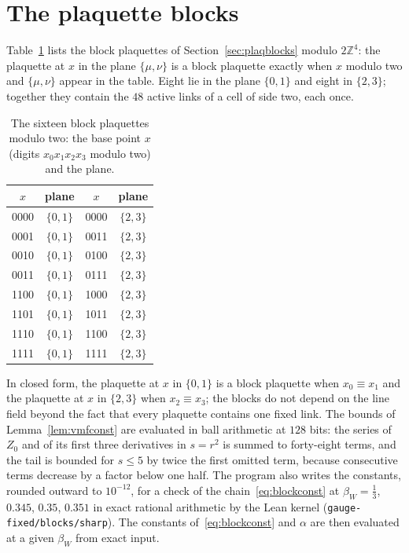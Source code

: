 \documentclass[11pt]{amsart}
\theoremstyle{definition}
\theoremstyle{remark}
\numberwithin{equation}{section}
\newcommand{\Z}{\mathbb{Z}}
\begin{document}
\section{The plaquette blocks}\label{app:plaqblocks}

Table~\ref{tab:plaqblocks} lists the block plaquettes of
Section~\ref{sec:plaqblocks} modulo $2\Z^4$: the plaquette at $x$ in the plane
$\{\mu,\nu\}$ is a block plaquette exactly when $x$ modulo two and
$\{\mu,\nu\}$ appear in the table. Eight lie in the plane $\{0,1\}$ and eight
in $\{2,3\}$; together they contain the $48$ active links of a cell of side
two, each once.

\begin{table}[h]
\caption{The sixteen block plaquettes modulo two: the base point $x$
(digits $x_0x_1x_2x_3$ modulo two) and the plane.}
\label{tab:plaqblocks}
\centering
\begin{tabular}{cccc}
\toprule
$x$&plane&$x$&plane\\
\midrule
0000&$\{0,1\}$&0000&$\{2,3\}$\\
0001&$\{0,1\}$&0011&$\{2,3\}$\\
0010&$\{0,1\}$&0100&$\{2,3\}$\\
0011&$\{0,1\}$&0111&$\{2,3\}$\\
1100&$\{0,1\}$&1000&$\{2,3\}$\\
1101&$\{0,1\}$&1011&$\{2,3\}$\\
1110&$\{0,1\}$&1100&$\{2,3\}$\\
1111&$\{0,1\}$&1111&$\{2,3\}$\\
\bottomrule
\end{tabular}
\end{table}

In closed form, the plaquette at $x$ in $\{0,1\}$ is a block plaquette when
$x_0\equiv x_1$ and the plaquette at $x$ in $\{2,3\}$ when $x_2\equiv x_3$; the
blocks do not depend on the line field beyond the fact that every plaquette
contains one fixed link. The bounds of Lemma~\ref{lem:vmfconst} are evaluated in ball arithmetic
at $128$ bits: the series of $Z_0$ and of its first three derivatives in
$s=r^2$ is summed to forty-eight terms, and the tail is bounded for $s\le5$ by
twice the first omitted term, because consecutive
terms decrease by a factor below one half. The program also writes the
constants, rounded outward to $10^{-12}$, for a check of the chain~\eqref{eq:blockconst}
at $\beta_W=\frac13$, $0.345$, $0.35$, $0.351$ in exact rational arithmetic by the Lean kernel
(\texttt{gauge-fixed/blocks/sharp}). The constants
of~\eqref{eq:blockconst} and $\alpha$ are then evaluated at a given $\beta_W$
from exact input.
\end{document}
